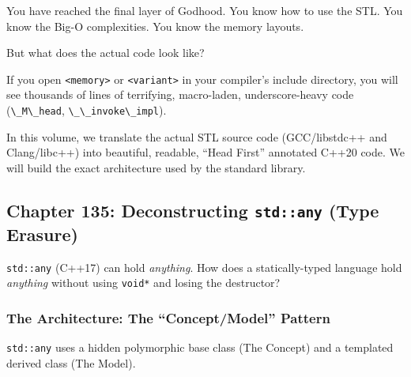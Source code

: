 You have reached the final layer of Godhood. You know how to use the
STL. You know the Big-O complexities. You know the memory layouts.

But what does the actual code look like?

If you open \passthrough{\lstinline!<memory>!} or
\passthrough{\lstinline!<variant>!} in your compiler's include
directory, you will see thousands of lines of terrifying, macro-laden,
underscore-heavy code (\passthrough{\lstinline!\_M\_head!},
\passthrough{\lstinline!\_\_invoke\_impl!}).

In this volume, we translate the actual STL source code (GCC/libstdc++
and Clang/libc++) into beautiful, readable, ``Head First'' annotated
C++20 code. We will build the exact architecture used by the standard
library.

\hypertarget{chapter-135-deconstructing-stdany-type-erasure}{%
\subsection{\texorpdfstring{Chapter 135: Deconstructing
\texttt{std::any} (Type
Erasure)}{Chapter 135: Deconstructing std::any (Type Erasure)}}\label{chapter-135-deconstructing-stdany-type-erasure}}

\passthrough{\lstinline!std::any!} (C++17) can hold \emph{anything}. How
does a statically-typed language hold \emph{anything} without using
\passthrough{\lstinline!void*!} and losing the destructor?

\hypertarget{the-architecture-the-conceptmodel-pattern}{%
\subsubsection{The Architecture: The ``Concept/Model''
Pattern}\label{the-architecture-the-conceptmodel-pattern}}

\passthrough{\lstinline!std::any!} uses a hidden polymorphic base class
(The Concept) and a templated derived class (The Model).

